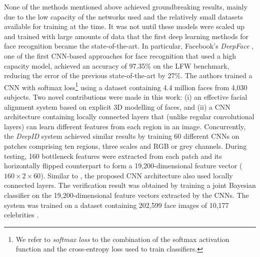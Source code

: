 \documentclass[conference]{IEEEtran}
\begin{document}
None of the methods mentioned above achieved groundbreaking results, mainly due to the low capacity of the networks used and the relatively small datasets available for training at the time. It was not until these models were scaled up and trained with large amounts of data \cite{krizhevsky2012imagenet} that the first deep learning methods for face recognition \cite{taigman2014deepface,sun2014deep} became the state-of-the-art. In particular, Facebook's \textit{DeepFace} \cite{taigman2014deepface}, one of the first CNN-based approaches for face recognition that used a high capacity model, achieved an accuracy of 97.35\% on the LFW benchmark, reducing the error of the previous state-of-the-art by 27\%. The authors trained a CNN with softmax loss\footnote{We refer to \textit{softmax loss} to the combination of the softmax activation function and the cross-entropy loss used to train classifiers.} using a dataset containing 4.4 million faces from 4,030 subjects. Two novel contributions were made in this work: (i) an effective facial alignment system based on explicit 3D modelling of faces, and (ii) a CNN architecture containing locally connected layers \cite{gregor2010emergence,huang2012learning} that (unlike regular convolutional layers) can learn different features from each region in an image. Concurrently, the \textit{DeepID} system \cite{sun2014deep} achieved similar results by training 60 different CNNs on patches comprising ten regions, three scales and RGB or grey channels. During testing, 160 bottleneck features were extracted from each patch and its horizontally flipped counterpart to form a 19,200-dimensional feature vector ($160 \times 2 \times 60$). Similar to \cite{taigman2014deepface}, the proposed CNN architecture also used locally connected layers. The verification result was obtained by training a joint Bayesian classifier \cite{chen2012bayesian} on the 19,200-dimensional feature vectors extracted by the CNNs. The system was trained on a dataset containing 202,599 face images of 10,177 celebrities \cite{sun2014deep}.
\end{document}
